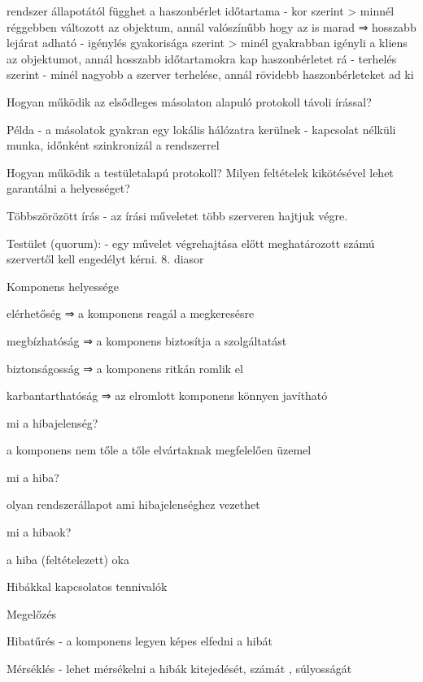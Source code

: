 \documentclass[12pt]{article}
\begin{document}
\begin{description}[style=unboxed]
    \item rendszer állapotától függhet a haszonbérlet időtartama
        - kor szerint 
        > minnél réggebben változott az objektum, annál valószínűbb hogy az is marad 
        ⇒ hosszabb lejárat adható
        - igénylés gyakorisága szerint
        > minél gyakrabban igényli a kliens az objektumot, annál hosszabb időtartamokra kap haszonbérletet rá
        - terhelés szerint
        - minél nagyobb a szerver terhelése, annál rövidebb haszonbérleteket ad ki 
    \item  Hogyan működik az elsődleges másolaton alapuló protokoll távoli írással?	
    \item Példa
        - a másolatok gyakran egy lokális hálózatra kerülnek
        - kapcsolat nélküli munka, időnként szinkronizál a rendszerrel	
    \item  Hogyan működik a testületalapú protokoll? Milyen feltételek kikötésével lehet garantálni a helyességet?
    \item Többszörözött írás
        - az írási műveletet több szerveren hajtjuk végre.
    \item Testület (quorum): 
        - egy művelet végrehajtása előtt meghatározott számú szervertől kell engedélyt kérni.
        8. diasor
    \item  Komponens helyessége
    \item elérhetőség       ⇒ a komponens reagál a megkeresésre
    \item megbízhatóság     ⇒ a komponens biztosítja a szolgáltatást
    \item biztonságosság    ⇒ a komponens ritkán romlik el
    \item karbantarthatóság ⇒ az elromlott komponens könnyen javítható
    \item  mi a hibajelenség?
    \item a komponens nem tőle a tőle elvártaknak megfelelően üzemel
    \item  mi a hiba?
    \item olyan rendszerállapot ami hibajelenséghez vezethet
    \item  mi a hibaok?
    \item a hiba (feltételezett) oka
    \item  Hibákkal kapcsolatos tennivalók
    \item Megelőzés
    \item Hibatűrés
        - a komponens legyen képes elfedni a hibát
    \item Mérséklés
        - lehet mérsékelni a hibák kitejedését, számát , súlyosságát

\end{description}
\end{document}
